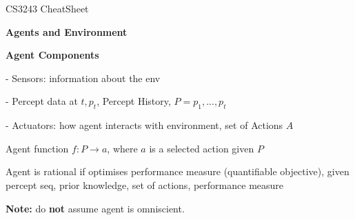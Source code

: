 \documentclass[10pt, a4paper]{article}
\author{Zachary Chua Yan Ern}
\date{February 2022}
\newcommand{\highlight}[1]{{\color{red}\textbf{#1}}}
\newcommand{\blue}[1]{{\color{MidnightBlue}#1}}
\newcommand{\red}[1]{{\color{red}#1}}
\newcommand{\green}[1]{{\color{PineGreen}#1}}
\newcommand{\header}[1]{{\normalsize\textbf{#1}}}
\newcommand{\tab}[0]{\hspace*{2mm}}
\begin{document}
	\scriptsize %
	\setlength\parindent{0pt}
	\setlength{\columnseprule}{0.1pt}
	
	\begin{center}
		{\large CS3243 CheatSheet}
	\end{center}
	
	\begin{multicols*}{3}
		\header{Agents and Environment}

		\textbf{Agent Components}


	  	- Sensors: information about the env

	  	\tab - Percept data at $t, p_{t}$, Percept History, $P = {p_{1}, ..., p_{t}}$

	  	- Actuators: how agent interacts with environment, set of \blue{Actions} $A$

	  	\green{Agent function $f: P \rightarrow a$}, where $a$ is a selected action given $P$

	  	Agent is \red{rational} if \red{optimises} performance measure (quantifiable objective), given percept seq, prior knowledge, set of actions, performance measure

	  	\highlight{Note:} do \textbf{not} assume agent is omniscient.















\end{multicols*}
\end{document}
